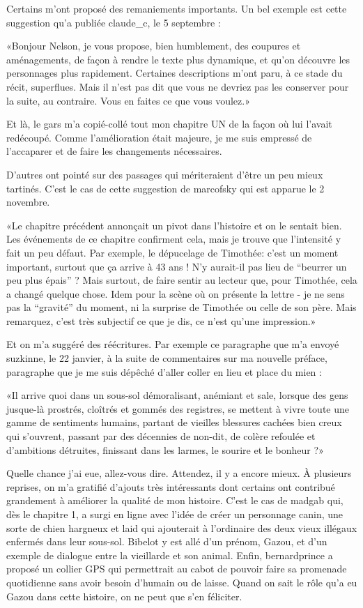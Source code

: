 \begin{Postface}
Certains m’ont proposé des remaniements importants. Un bel exemple est cette suggestion qu’a publiée claude_c, le 5 septembre :

    «Bonjour Nelson, je vous propose, bien humblement, des coupures et aménagements, de façon à rendre le texte plus dynamique, et qu’on découvre les personnages plus rapidement. Certaines descriptions m’ont paru, à ce stade du récit, superflues. Mais il n’est pas dit que vous ne devriez pas les conserver pour la suite, au contraire. Vous en faites ce que vous voulez.»

Et là, le gars m’a copié-collé tout mon chapitre UN de la façon où lui l’avait redécoupé. Comme l’amélioration était majeure, je me suis empressé de l’accaparer et de faire les changements nécessaires.

D’autres ont pointé sur des passages qui mériteraient d’être un peu mieux tartinés. C’est le cas de cette suggestion de marcofsky qui est apparue le 2 novembre.

    «Le chapitre précédent annonçait un pivot dans l’histoire et on le sentait bien. Les événements de ce chapitre confirment cela, mais je trouve que l’intensité y fait un peu défaut. Par exemple, le dépucelage de Timothée: c’est un moment important, surtout que ça arrive à 43 ans ! N’y aurait-il pas lieu de “beurrer un peu plus épais” ? Mais surtout, de faire sentir au lecteur que, pour Timothée, cela a changé quelque chose. Idem pour la scène où on présente la lettre - je ne sens pas la “gravité” du moment, ni la surprise de Timothée ou celle de son père. Mais remarquez, c’est très subjectif ce que je dis, ce n’est qu’une impression.»

Et on m’a suggéré des réécritures. Par exemple ce paragraphe que m’a envoyé suzkinne, le 22 janvier, à la suite de commentaires sur ma nouvelle préface, paragraphe que je me suis dépêché d’aller coller en lieu et place du mien :

    «Il arrive quoi dans un sous-sol démoralisant, anémiant et sale, lorsque des gens jusque-là prostrés, cloîtrés et gommés des registres, se mettent à vivre toute une gamme de sentiments humains, partant de vieilles blessures cachées bien creux qui s’ouvrent, passant par des décennies de non-dit, de colère refoulée et d’ambitions détruites, finissant dans les larmes, le sourire et le bonheur ?»

Quelle chance j’ai eue, allez-vous dire. Attendez, il y a encore mieux. À plusieurs reprises, on m’a gratifié d’ajouts très intéressants dont certains ont contribué grandement à améliorer la qualité de mon histoire. C’est le cas de madgab qui, dès le chapitre 1, a surgi en ligne avec l’idée de créer un personnage canin, une sorte de chien hargneux et laid qui ajouterait à l’ordinaire des deux vieux illégaux enfermés dans leur sous-sol. Bibelot y est allé d’un prénom, Gazou, et d’un exemple de dialogue entre la vieillarde et son animal. Enfin, bernardprince a proposé un collier GPS qui permettrait au cabot de pouvoir faire sa promenade quotidienne sans avoir besoin d’humain ou de laisse. Quand on sait le rôle qu’a eu Gazou dans cette histoire, on ne peut que s’en féliciter.


\end{Postface}
